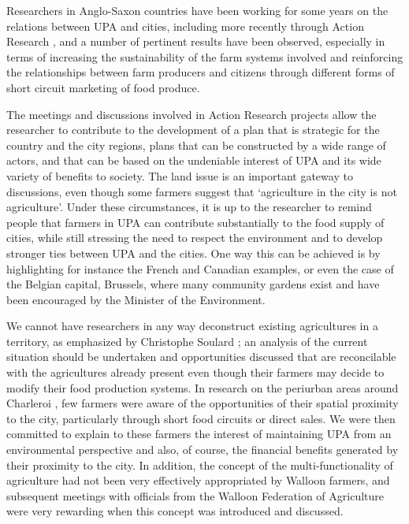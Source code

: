 \documentclass[10pt,a4paper]{article}
\begin{document}
\begin{multicols}{2}
Researchers in Anglo-Saxon countries have been working for some years on the relations between UPA and cities, including more recently through Action Research \citep{r27, r06}, and a number of pertinent results have been observed, especially in terms of increasing the sustainability of the farm systems involved and reinforcing the relationships between farm producers and citizens through different forms of short circuit marketing of food produce.

The meetings and discussions involved in Action Research projects allow the researcher to contribute to the development of a plan that is strategic for the country and the city regions, plans that can be constructed by a wide range of actors, and that can be based on the undeniable interest of UPA and its wide variety of benefits to society. The land issue is an important gateway to discussions, even though some farmers suggest that `agriculture in the city is not agriculture'.  Under these circumstances, it is up to the researcher to remind people that farmers in UPA can contribute substantially to the food supply of cities, while still stressing the need to respect the environment and to develop stronger ties between UPA and the cities. One way this can be achieved is by highlighting for instance the French and Canadian examples, or even the case of the Belgian capital, Brussels, where many community gardens exist and have been encouraged by the Minister of the Environment.

We cannot have researchers in any way deconstruct existing agricultures in a territory, as emphasized by Christophe Soulard \citep{r18}; an analysis of the current situation should be undertaken and opportunities discussed that are reconcilable with the agricultures already present even though their farmers may decide to modify their food production systems. In research on the periurban areas around Charleroi \citep{r11}, few farmers were aware of the opportunities of their spatial proximity to the city, particularly through short food circuits or direct sales.  We were then committed to explain to these farmers the interest of maintaining UPA from an environmental perspective and also, of course, the financial benefits generated by their proximity to the city. In addition, the concept of the multi-functionality of agriculture had not been very effectively appropriated by Walloon farmers, and subsequent meetings with officials from the Walloon Federation of Agriculture were very rewarding when this concept was introduced and discussed.


\end{multicols}
\end{document}
